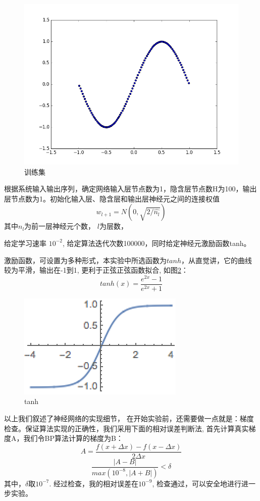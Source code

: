 \documentclass{article}
\begin{document}
\begin{CJK}{UTF8}{gkai}
\begin{figure}
	\centering
	\includegraphics[width=\linewidth]{../scatter}
	\caption{训练集}
	\label{fig:fig0}
\end{figure}

根据系统输入输出序列，确定网络输入层节点数为1，隐含层节点数H为100，输出层节点数为1。初始化输入层、隐含层和输出层神经元之间的连接权值\cite{he2015delving}
\begin{equation}
	w_{l+1} = N(0,\sqrt{2/\hat{n_l}})
\end{equation}
其中$n_l$为前一层神经元个数， $l$为层数，

给定学习速率 $10^{-2}$, 给定算法迭代次数100000，同时给定神经元激励函数tanh。

激励函数，可设置为多种形式，本实验中所选函数为$tanh$，从直觉讲，它的曲线较为平滑，输出在-1到1, 更利于正弦正弦函数拟合, 如图\ref{fig:tanh}：
\begin{equation}
	tanh(x) = \frac{e^{2x}-1}{e^{2x}+1}
\end{equation}
\begin{figure}
	\centering
	\includegraphics[width=.3\linewidth]{../tanh}
	\caption{tanh}
	\label{fig:tanh}
\end{figure}
以上我们叙述了神经网络的实现细节， 在开始实验前，还需要做一点就是：梯度检查。保证算法实现的正确性，我们采用下面的相对误差判断法, 首先计算真实梯度A，我们令BP算法计算的梯度为B：
\begin{equation}
	A = \frac{f(x+\Delta x)-f(x-\Delta x)}{2\Delta x}
\end{equation}
\begin{equation}
\frac{|A-B|}{max(10^{-8}, |A+B|)} < \delta
\end{equation}
其中，$\delta$取$10^{-7}$. 经过检查，我的相对误差在$10^{-9}$, 检查通过，可以安全地进行进一步实验。


\end{CJK}
\end{document}
